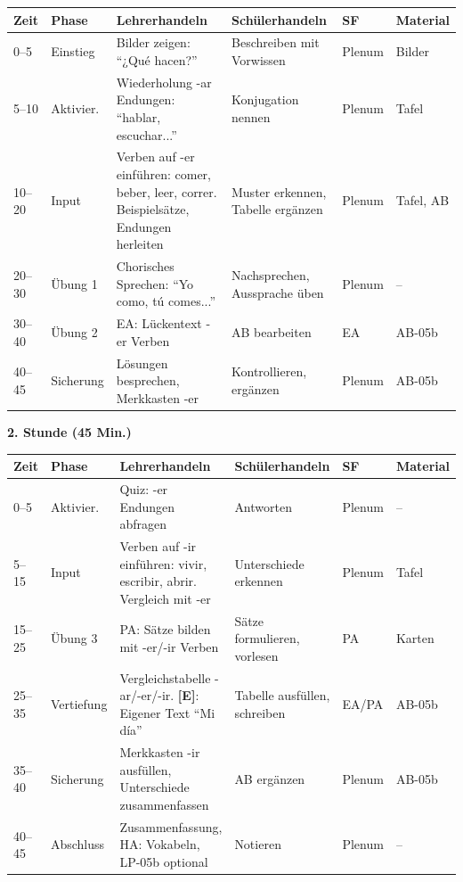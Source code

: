 \documentclass[11pt,a4paper]{article}
\newcommand{\E}{\textcolor{erweiterung}{\textbf{[E]}}}
\begin{document}
\begin{longtable}{|p{1cm}|p{1.5cm}|p{4cm}|p{3cm}|p{1.5cm}|p{2cm}|}
\hline
\textbf{Zeit} & \textbf{Phase} & \textbf{Lehrerhandeln} & \textbf{Schülerhandeln} & \textbf{SF} & \textbf{Material} \\
\hline
\endhead

0--5 & Einstieg & Bilder zeigen: ``¿Qué hacen?'' & Beschreiben mit Vorwissen & Plenum & Bilder \\
\hline

5--10 & Aktivier. & Wiederholung -ar Endungen: ``hablar, escuchar...'' & Konjugation nennen & Plenum & Tafel \\
\hline

10--20 & Input & Verben auf -er einführen: comer, beber, leer, correr. Beispielsätze, Endungen herleiten & Muster erkennen, Tabelle ergänzen & Plenum & Tafel, AB \\
\hline

20--30 & Übung 1 & Chorisches Sprechen: ``Yo como, tú comes...'' & Nachsprechen, Aussprache üben & Plenum & -- \\
\hline

30--40 & Übung 2 & EA: Lückentext -er Verben & AB bearbeiten & EA & AB-05b \\
\hline

40--45 & Sicherung & Lösungen besprechen, Merkkasten -er & Kontrollieren, ergänzen & Plenum & AB-05b \\
\hline
\end{longtable}

\vspace{1em}

\textbf{2. Stunde (45 Min.)}

\begin{longtable}{|p{1cm}|p{1.5cm}|p{4cm}|p{3cm}|p{1.5cm}|p{2cm}|}
\hline
\textbf{Zeit} & \textbf{Phase} & \textbf{Lehrerhandeln} & \textbf{Schülerhandeln} & \textbf{SF} & \textbf{Material} \\
\hline
\endhead

0--5 & Aktivier. & Quiz: -er Endungen abfragen & Antworten & Plenum & -- \\
\hline

5--15 & Input & Verben auf -ir einführen: vivir, escribir, abrir. Vergleich mit -er & Unterschiede erkennen & Plenum & Tafel \\
\hline

15--25 & Übung 3 & PA: Sätze bilden mit -er/-ir Verben & Sätze formulieren, vorlesen & PA & Karten \\
\hline

25--35 & Vertiefung & Vergleichstabelle -ar/-er/-ir. \E{}: Eigener Text ``Mi día'' & Tabelle ausfüllen, schreiben & EA/PA & AB-05b \\
\hline

35--40 & Sicherung & Merkkasten -ir ausfüllen, Unterschiede zusammenfassen & AB ergänzen & Plenum & AB-05b \\
\hline

40--45 & Abschluss & Zusammenfassung, HA: Vokabeln, LP-05b optional & Notieren & Plenum & -- \\
\hline
\end{longtable}
\end{document}
